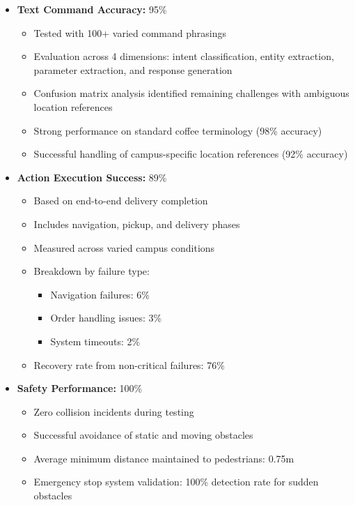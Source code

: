 \documentclass[12pt]{article}
\begin{document}
\begin{itemize}
    \item \textbf{Text Command Accuracy:} 95\%
    \begin{itemize}
        \item Tested with 100+ varied command phrasings
        \item Evaluation across 4 dimensions: intent classification, entity extraction, parameter extraction, and response generation
        \item Confusion matrix analysis identified remaining challenges with ambiguous location references
        \item Strong performance on standard coffee terminology (98\% accuracy)
        \item Successful handling of campus-specific location references (92\% accuracy)
    \end{itemize}
    
    \item \textbf{Action Execution Success:} 89\%
    \begin{itemize}
        \item Based on end-to-end delivery completion
        \item Includes navigation, pickup, and delivery phases
        \item Measured across varied campus conditions
        \item Breakdown by failure type:
        \begin{itemize}
            \item Navigation failures: 6\%
            \item Order handling issues: 3\%
            \item System timeouts: 2\%
        \end{itemize}
        \item Recovery rate from non-critical failures: 76\%
    \end{itemize}
    
    \item \textbf{Safety Performance:} 100\%
    \begin{itemize}
        \item Zero collision incidents during testing
        \item Successful avoidance of static and moving obstacles
        \item Average minimum distance maintained to pedestrians: 0.75m
        \item Emergency stop system validation: 100\% detection rate for sudden obstacles
    \end{itemize}
    

\end{itemize}
\end{document}
